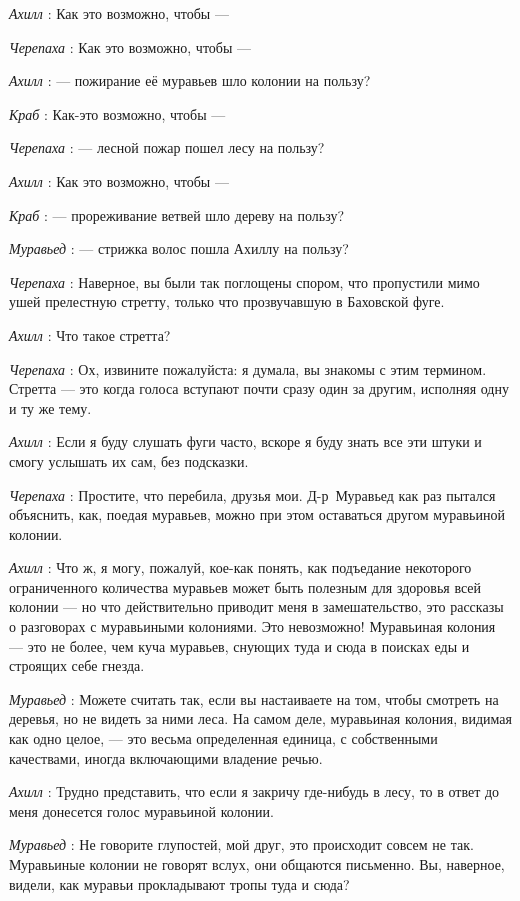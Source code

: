 \documentclass[../main.tex]{subfiles}
\begin{document}
\begin{dialogue}
\emph{Ахилл} : Как это возможно, чтобы ---

\emph{Черепаха} : Как это возможно, чтобы ---

\emph{Ахилл} : --- пожирание её муравьев шло колонии на пользу?

\emph{Краб} : Как-это возможно, чтобы ---

\emph{Черепаха} : --- лесной пожар пошел лесу на пользу?

\emph{Ахилл} : Как это возможно, чтобы ---

\emph{Краб} : --- прореживание ветвей шло дереву на пользу?

\emph{Муравьед} : --- стрижка волос пошла Ахиллу на пользу?

\emph{Черепаха} : Наверное, вы были так поглощены спором, что пропустили мимо ушей прелестную стретту, только что прозвучавшую в Баховской фуге.

\emph{Ахилл} : Что такое стретта?

\emph{Черепаха} : Ох, извините пожалуйста: я думала, вы знакомы с этим термином. Стретта --- это когда голоса вступают почти сразу один за другим, исполняя одну и ту же тему.

\emph{Ахилл} : Если я буду слушать фуги часто, вскоре я буду знать все эти штуки и смогу услышать их сам, без подсказки.

\emph{Черепаха} : Простите, что перебила, друзья мои. Д-р~Муравьед как раз пытался объяснить, как, поедая муравьев, можно при этом оставаться другом муравьиной колонии.

\emph{Ахилл} : Что ж, я могу, пожалуй, кое-как понять, как подъедание некоторого ограниченного количества муравьев может быть полезным для здоровья всей колонии --- но что действительно приводит меня в замешательство, это рассказы о разговорах с муравьиными колониями. Это невозможно! Муравьиная колония --- это не более, чем куча муравьев, снующих туда и сюда в поисках еды и строящих себе гнезда.

\emph{Муравьед} : Можете считать так, если вы настаиваете на том, чтобы смотреть на деревья, но не видеть за ними леса. На самом деле, муравьиная колония, видимая как одно целое, --- это весьма определенная единица, с собственными качествами, иногда включающими владение речью.

\emph{Ахилл} : Трудно представить, что если я закричу где-нибудь в лесу, то в ответ до меня донесется голос муравьиной колонии.

\emph{Муравьед} : Не говорите глупостей, мой друг, это происходит совсем не так. Муравьиные колонии не говорят вслух, они общаются письменно. Вы, наверное, видели, как муравьи прокладывают тропы туда и сюда?


\end{dialogue}
\end{document}
